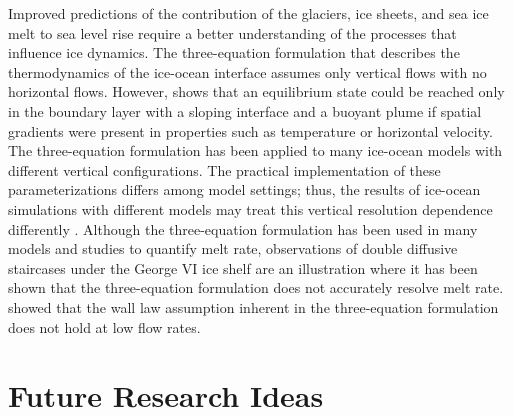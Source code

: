 \documentclass[11pt,a4paper]{article}
\begin{document}
    Improved predictions of the contribution of the glaciers, ice sheets, and sea ice melt to sea level rise require a better understanding of the processes that influence ice dynamics. The three-equation formulation that describes the thermodynamics of the ice-ocean interface assumes only vertical flows with no horizontal flows. However, \cite{jenkins2016simple} shows that an equilibrium state could be reached only in the boundary layer with a sloping interface and a buoyant plume if spatial gradients were present in properties such as temperature or horizontal velocity. The three-equation formulation has been applied to many ice-ocean models with different vertical configurations. The practical implementation of these parameterizations differs among model settings; thus, the results of ice-ocean simulations with different models may treat this vertical resolution dependence differently \citep{gwyther2020vertical}. Although the three-equation formulation has been used in many models and studies to quantify melt rate, observations of double diffusive staircases under the George VI ice shelf \citep{kimura2015estimation} are an illustration where it has been shown that the three-equation formulation does not accurately resolve melt rate. \cite{davis2019turbulence} showed that the wall law assumption inherent in the three-equation formulation does not hold at low flow rates.
    \section{Future Research Ideas}
    
\end{document}
